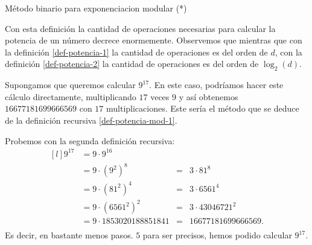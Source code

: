 \begin{section}{Método binario para exponenciacion modular (*)}
    
    Con esta definición la cantidad de operaciones necesarias para calcular la potencia de un número decrece enormemente. Observemos que mientras que con la definición \eqref{def-potencia-1} la cantidad  de operaciones es del orden de $d$,  con la definición \eqref{def-potencia-2} la cantidad de operaciones es del orden de $\log_2(d)$. 
    
    
\begin{ejemplo}\label{ejemplo-9**17}
    Supongamos que queremos calcular $9^{17}$.  En  este caso, podríamos hacer este cálculo  directamente, multiplicando $17$ veces $9$ y así obtenemos $16677181699666569$ con $17$ multiplicaciones. Este sería el método que se deduce de la definición recursiva \eqref{def-potencia-mod-1}. 

    Probemos con la segunda definición recursiva:
    \begin{equation}\label{eq-9**17}
        \begin{matrix*}[l]
            9^{17}  &=  9 \cdot 9^{16}& & \\
                    &=  9 \cdot (9^{2})^8   &=& 3 \cdot 81^8 \\
                    &=  9 \cdot (81^2)^4 &=&  3 \cdot 6561^4  \\
                    &=  9 \cdot (6561^2)^2 &=&  3 \cdot 43046721^2\\
                    &=  9 \cdot 1853020188851841 &=&  16677181699666569.\\
        \end{matrix*}
    \end{equation}
Es decir,  en bastante menos pasos. $5$ para ser precisos,  hemos podido calcular $9^{17}$.
\end{ejemplo}


\end{section}
